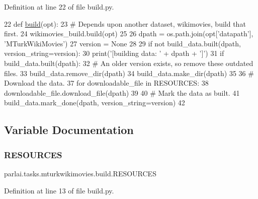 Definition at line 22 of file build.\+py.


\begin{DoxyCode}
22 \textcolor{keyword}{def }\hyperlink{namespacedialog__babi__feedback_1_1build_a7a9d289f7493a5ded13c4b7f071b6184}{build}(opt):
23     \textcolor{comment}{# Depends upon another dataset, wikimovies, build that first.}
24     wikimovies\_build.build(opt)
25 
26     dpath = os.path.join(opt[\textcolor{stringliteral}{'datapath'}], \textcolor{stringliteral}{'MTurkWikiMovies'})
27     version = \textcolor{keywordtype}{None}
28 
29     \textcolor{keywordflow}{if} \textcolor{keywordflow}{not} build\_data.built(dpath, version\_string=version):
30         print(\textcolor{stringliteral}{'[building data: '} + dpath + \textcolor{stringliteral}{']'})
31         \textcolor{keywordflow}{if} build\_data.built(dpath):
32             \textcolor{comment}{# An older version exists, so remove these outdated files.}
33             build\_data.remove\_dir(dpath)
34         build\_data.make\_dir(dpath)
35 
36         \textcolor{comment}{# Download the data.}
37         \textcolor{keywordflow}{for} downloadable\_file \textcolor{keywordflow}{in} RESOURCES:
38             downloadable\_file.download\_file(dpath)
39 
40         \textcolor{comment}{# Mark the data as built.}
41         build\_data.mark\_done(dpath, version\_string=version)
42 \end{DoxyCode}


\subsection{Variable Documentation}
\mbox{\label{namespaceparlai_1_1tasks_1_1mturkwikimovies_1_1build_a842cd64e233c6a702fc8438ee9de4088}} 
\subsubsection{\texorpdfstring{R\+E\+S\+O\+U\+R\+C\+ES}{RESOURCES}}
{\footnotesize\ttfamily parlai.\+tasks.\+mturkwikimovies.\+build.\+R\+E\+S\+O\+U\+R\+C\+ES}



Definition at line 13 of file build.\+py.

